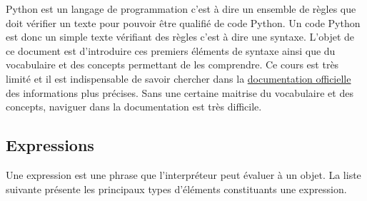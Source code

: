 


Python est un langage de programmation c'est à dire un ensemble de règles que doit vérifier un texte pour pouvoir être qualifié de \og code Python\fg. Un code Python est donc un simple texte vérifiant des règles c'est à dire une syntaxe. L'objet de ce document est d'introduire ces premiers éléments de syntaxe ainsi que du vocabulaire et des concepts permettant de les comprendre. Ce cours est très limité et il est indispensable de savoir chercher dans la \href{http://docs.python.org/3.3/reference/}{documentation officielle} des informations plus précises. Sans une certaine maitrise du vocabulaire et des concepts, naviguer dans la documentation est très difficile.
\subsection{Expressions}
Une expression est une phrase que l'interpréteur peut évaluer à un objet. La liste suivante présente les principaux types d'éléments constituants une expression.
